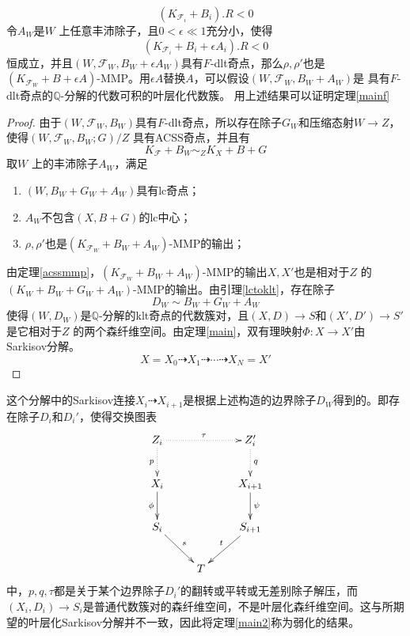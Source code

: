 \[ (K_{\mathcal{F}_{i}}+B_{i}).R<0 \]
令$A_{W}$是$W$ 上任意丰沛除子，且$0<\epsilon\ll 1$充分小，使得
\[ (K_{\mathcal{F}_{i}}+B_{i}+\epsilon A_{i}).R<0 \]
恒成立，并且$(W,\mathcal{F}_{W},B_{W}+\epsilon A_{W})$具有$F$-dlt奇点，那么$\rho,\rho'$也是$(K_{\mathcal{F}_{W}}+B+\epsilon A)$-MMP。用$\epsilon A$替换$A$，可以假设$(W,\mathcal{F}_{W},B_{W}+A_{W})$是 具有$F$-dlt奇点的$\mathbb{Q}$-分解的代数可积的叶层化代数簇。 
用上述结果可以证明定理\ref{mainf}
\begin{proof}
  由于$(W,\mathcal{F}_{W},B_{W})$具有$F$-dlt奇点，所以存在除子$G_{W}$和压缩态射$W\to Z$，使得$(W,\mathcal{F}_{W},B_{W};G)/Z$ 具有ACSS奇点，并且有
  \[ K_{\mathcal{F}}+B_{W} \sim_{Z} K_{X}+B+G \]
 取$W$ 上的丰沛除子$A_{W}$，满足
 \begin{enumerate}
   \item $(W,B_{W}+G_{W}+A_{W}) $具有lc奇点；
   \item $A_{W}$不包含$(X,B+G)$的lc中心；
   \item $\rho,\rho' $也是$(K_{\mathcal{F}_{W}}+B_{W}+A_{W})$-MMP的输出；
 \end{enumerate}
 由定理\ref{acssmmp}，$(K_{\mathcal{F}_{W}}+B_{W}+A_{W})$-MMP的输出$X,X'$也是相对于$Z$ 的$(K_{W}+B_{W}+G_{W}+A_{W})$-MMP的输出。由引理\ref{lctoklt}，存在除子
\[ D_{W}\sim B_{W}+G_{W}+A_{W} \]
使得$(W,D_{W})$是$\mathbb{Q}$-分解的klt奇点的代数簇对，且$(X,D)\to S $和$(X',D')\to S' $是它相对于$Z$ 的两个森纤维空间。由定理\ref{main}，双有理映射$\Phi:X\to X'$由Sarkisov分解。 
\[ X=X_{0}\dashrightarrow X_{1}\dashrightarrow \cdots \dashrightarrow X_{N}=X' \]
\end{proof}

\begin{remark}
 这个分解中的Sarkisov连接$X_{i}\dashrightarrow X_{i+1}$是根据上述构造的边界除子$D_{W}$得到的。即存在除子$D_{i}$和$D_{i}'$，使得交换图表
  \[ \xymatrix{
      Z_{i}\ar@{.>}[d]_p\ar@{.>}[rr]^{\tau}&&Z_{i}'\ar@{.>}[d]^q\\
      X_{i}\ar[d]_{\phi}&&X_{i+1}\ar[d]^\psi\\
      S_{i}\ar[rd]^s&&S_{i+1}\ar[ld]_t\\
      &T&} \]
      中，$p,q,\tau$都是关于某个边界除子$D_{i}'$的翻转或平转或无差别除子解压，而$(X_{i},D_{i})\to S_{i}$是普通代数簇对的森纤维空间，不是叶层化森纤维空间。这与所期望的叶层化Sarkisov分解并不一致，因此将定理\ref{main2}称为弱化的结果。
\end{remark}

